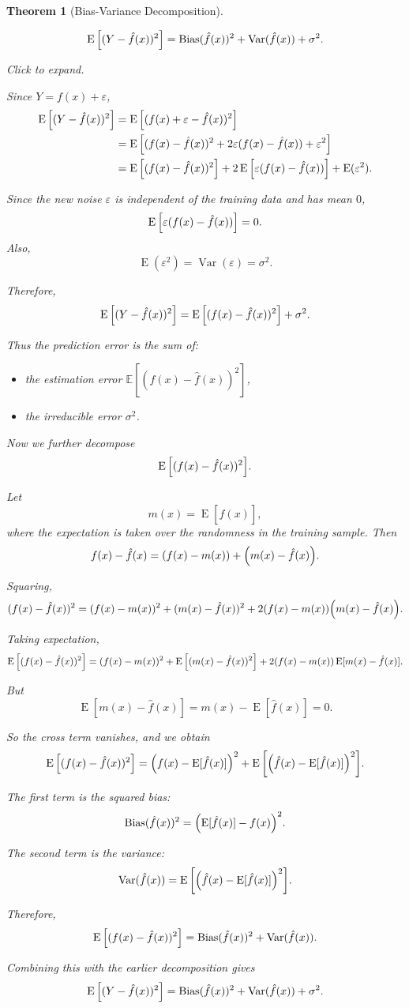 \documentclass[
  letterpaper,
  DIV=11,
  numbers=noendperiod]{scrreprt}
\providecommand{\tightlist}{%
  \setlength{\itemsep}{0pt}\setlength{\parskip}{0pt}}
\newcommand{\Exp}{\operatorname{E}}
\newcommand{\Var}{\operatorname{Var}}
\theoremstyle{definition}
\theoremstyle{definition}
\theoremstyle{plain}
\newtheorem{theorem}{Theorem}[chapter]
\theoremstyle{plain}
\theoremstyle{remark}
\begin{document}
\begin{theorem}[Bias-Variance
Decomposition]\protect\hypertarget{thm-}{}\label{thm-}

\[
\Exp\qty[(Y-\hat f(x))^2]
=
\operatorname{Bias}(\hat f(x))^2+\operatorname{Var}(\hat f(x))+\sigma^2.
\]

Click to expand.

Since \(Y=f(x)+\varepsilon\), \[
\begin{split}
\Exp\qty[(Y-\hat f(x))^2]&=\Exp\qty[(f(x)+\varepsilon-\hat f(x))^2]\\
&=\Exp\qty[(f(x)-\hat f(x))^2+2\varepsilon(f(x)-\hat f(x))+\varepsilon^2]\\
&=\Exp\qty[(f(x)-\hat f(x))^2]+2\Exp\qty[\varepsilon(f(x)-\hat f(x))]+\Exp(\varepsilon^2).
\end{split}
\]

Since the new noise \(\varepsilon\) is independent of the training data
and has mean \(0\), \[
\Exp\qty[\varepsilon(f(x)-\hat f(x))]=0.
\] Also, \[
\Exp(\varepsilon^2)=\Var(\varepsilon)=\sigma^2.
\]

Therefore, \[
\Exp\qty[(Y-\hat f(x))^2]
=
\Exp\qty[(f(x)-\hat f(x))^2]+\sigma^2.
\]

Thus the prediction error is the sum of:

\begin{itemize}
\tightlist
\item
  the estimation error \(\mathbb{E}[(f(x)-\hat f(x))^2]\),
\item
  the irreducible error \(\sigma^2\).
\end{itemize}

Now we further decompose \[
\Exp\qty[(f(x)-\hat f(x))^2].
\]

Let \[
m(x)=\Exp[\hat f(x)],
\] where the expectation is taken over the randomness in the training
sample. Then \[
f(x)-\hat f(x)=\qty(f(x)-m(x))+\qty(m(x)-\hat f(x)).
\]

Squaring, \[
(f(x)-\hat f(x))^2
=
(f(x)-m(x))^2
+
(m(x)-\hat f(x))^2
+
2\qty(f(x)-m(x))\qty(m(x)-\hat f(x)).
\]

Taking expectation, \[
\Exp\qty[(f(x)-\hat f(x))^2]
=
(f(x)-m(x))^2
+
\Exp\qty[(m(x)-\hat f(x))^2]
+
2\qty(f(x)-m(x))\Exp[m(x)-\hat f(x)].
\]

But \[
\Exp[m(x)-\hat f(x)]
=
m(x)-\Exp[\hat f(x)]
=
0.
\]

So the cross term vanishes, and we obtain \[
\Exp\qty[(f(x)-\hat f(x))^2]
=
\qty(f(x)-\Exp[\hat f(x)])^2
+
\Exp\qty[\qty(\hat f(x)-\Exp[\hat f(x)])^2].
\]

The first term is the squared bias: \[
\operatorname{Bias}(\hat f(x))^2
=
\qty(\Exp[\hat f(x)]-f(x))^2.
\]

The second term is the variance: \[
\Var(\hat f(x))
=
\Exp\qty[\qty(\hat f(x)-\Exp[\hat f(x)])^2].
\]

Therefore, \[
\Exp\qty[(f(x)-\hat f(x))^2]
=
\operatorname{Bias}(\hat f(x))^2+\Var(\hat f(x)).
\]

Combining this with the earlier decomposition gives \[
\Exp\qty[(Y-\hat f(x))^2]
=
\operatorname{Bias}(\hat f(x))^2+\operatorname{Var}(\hat f(x))+\sigma^2.
\]

\end{theorem}
\end{document}
